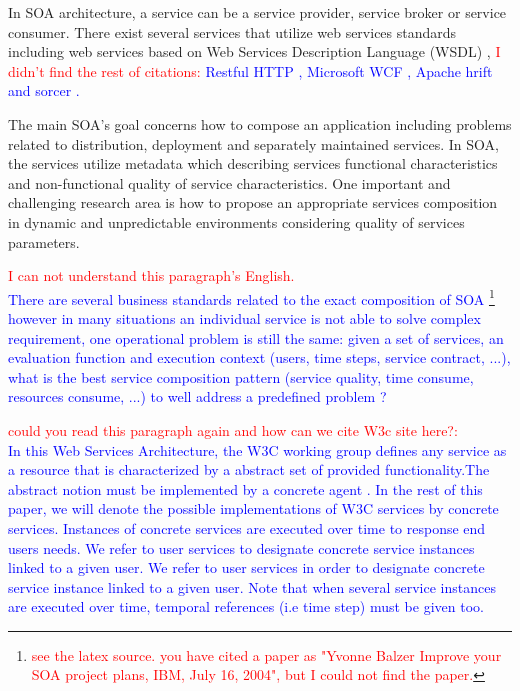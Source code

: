 \documentclass[10pt,journal,compsoc]{IEEEtran}
\newcommand{\red}[1]{\textcolor{red}{#1}}
\newcommand{\blue}[1]{\textcolor{blue}{#1}}
\begin{document}
In SOA architecture, a service can be a service provider, service broker or service consumer. There exist several services that utilize web services standards including web services based on Web Services Description Language (WSDL) \cite{christensen2001}, \red{ I didn't find the rest of citations:} \blue{Restful HTTP \cite{}, Microsoft WCF \cite{}, Apache hrift \cite{} and sorcer \cite{}.}

The main SOA's goal concerns how to compose an application including problems related to distribution, deployment and separately maintained services. In SOA, the services utilize metadata which describing services functional characteristics and non-functional quality of service characteristics. One important and challenging research area is how to propose an appropriate services composition in dynamic and unpredictable environments\cite{Mostafa2015,BenMabrouk2009,SONG2013} considering quality of services parameters. 

\red{I can not understand this paragraph's English.}\\
 \blue{There are several business standards related to the exact composition of SOA \cite{Yvonne Balzer Improve your SOA project plans, IBM, July 16, 2004,Valipour2009}\footnote{\red{see the latex source. you have cited a paper as "Yvonne Balzer Improve your SOA project plans, IBM, July 16, 2004", but I could not find the paper.}} however in many situations an individual service is not able to solve complex requirement, one operational problem is still the same: given a set of services, an evaluation function and execution context (users, time steps, service contract, ...), what is the best service composition pattern (service quality, time consume, resources consume, ...) to well address a predefined problem ?}

\red{could you read this paragraph again and how can we cite W3c site here?:  }\\
\blue{In this Web Services Architecture, the W3C working group defines any service as a resource that is characterized by a abstract set of provided functionality.The abstract notion must be implemented by a concrete agent \cite{https://www.w3.org/TR/ws-arch/}. In the rest of this paper, we will denote the possible implementations of W3C services by concrete services. Instances of concrete services are executed over time to response end users needs. We refer to user services to designate concrete service instances linked to a given user. We refer to user services in order to designate concrete service instance linked to a given user. Note that when several service instances are executed over time, temporal references (i.e time step) must be given too.}
\end{document}

